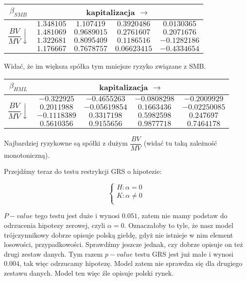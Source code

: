 \documentclass[11pt,a4paper]{report}
\begin{document}
\begin{center}
\begin{tabular}{|c|c|c|c|c|}
\hline
$\beta_{SMB}$ & \multicolumn{4}{|c|}{kapitalizacja $\longrightarrow$}  \\ \hline 
\multirow{4}{*}{$\dfrac{BV}{MV} \downarrow$} &  $ 1.348105 $ & $ 1.107419 $ & $ 0.3920486 $ & $ 0.0130365 $ \\ \cline{2-5}
 & $ 1.481069 $ & $ 0.9689015 $ & $ 0.2761607 $ & $ 0.2071676 $ \\ \cline{2-5}
 & $ 1.322681 $ & $ 0.8095409 $ & $ 0.1186516 $ & $ -0.1282186 $ \\ \cline{2-5}
 & $ 1.176667 $ & $ 0.7678757 $ & $ 0.06623415 $ & $ -0.4334654 $ \\ \hline
\end{tabular}
\end{center}

Widać, że im większa spółka tym mniejsze ryzyko związane z SMB.

\begin{center}
\begin{tabular}{|c|c|c|c|c|}
\hline
$\beta_{HML}$ & \multicolumn{4}{|c|}{kapitalizacja $\longrightarrow$}  \\ \hline 
\multirow{4}{*}{$\dfrac{BV}{MV} \downarrow$} &  $ -0.322925 $ & $ -0.4655263 $ & $ -0.0808298 $ & $ -0.2009929 $ \\ \cline{2-5}
 & $ 0.2011988 $ & $ -0.05619854 $ & $ 0.1663436 $ & $ -0.02250085 $ \\ \cline{2-5}
 & $ -0.1118389 $ & $ 0.3317198 $ & $ 0.5982598 $ & $ 0.247697 $ \\ \cline{2-5}
 & $ 0.5610356 $ & $ 0.9155656 $ & $ 0.9877718 $ & $ 0.7464178 $ \\ \hline
\end{tabular}
\end{center}

Najbardziej ryzykowne są spółki z dużym $\dfrac{BV}{MV}$ (widać tu taką zależność monotoniczną).

\bigskip

Przejdźmy teraz do testu restrykcji GRS o hipotezie:

$$
\left\{
\begin{array}{l}
H: \alpha = 0 \\
K: \alpha \neq 0\\
\end{array}
\right.
$$

$P-value$ tego testu jest duże i wynosi $0.051$, zatem nie mamy podstaw do odrzucenia hipotezy zerowej, czyli $\alpha = 0$. Oznaczałoby to tyle, że nasz model trójczynnikowy dobrze opisuje polską giełdę, gdyż nie istnieje w nim element losowości, przypadkowości. Sprawdźmy jeszcze jednak, czy dobrze opisuje on też drugi zestaw danych. Tym razem $p-value$ testu GRS jest już małe i wynosi $0.004$, tak więc odrzucamy hipotezę. Model zatem nie sprawdza się dla drugiego zestawu danych. Model ten więc źle opisuje polski rynek. 
\end{document}
